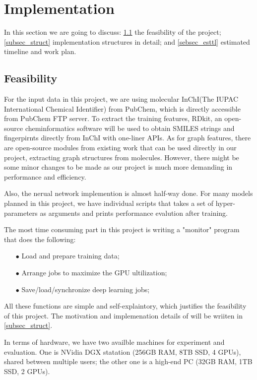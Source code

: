 \documentclass[conference]{IEEEtran}
\begin{document}
\section{Implementation} \label{sec_impl} 

In this section we are going to discuss: \ref{subsec_feas} the feasibility of the project; \ref{subsec_struct} implementation structures in detail; and \ref{sebsec_esttl} estimated timeline and work plan. 

\subsection{Feasibility} \label{subsec_feas} 

For the input data in this project, we are using molecular InChI(The IUPAC International Chemical Identifier) from PubChem, which is directly accessible from PubChem FTP server. 
To extract the training features, RDkit, an open-source cheminformatics software will be used to obtain SMILES strings and fingerpirnts directly from InChI with one-liner APIs. 
As for graph features, there are open-source modules from existing work \cite{gcn_fp} that can be used directly in our project, extracting graph structures from molecules. 
However, there might be some minor changes to be made as our project is much more demanding in performance and efficiency. 

Also, the nerual network implemention is almost half-way done. 
For many models planned in this project, we have individual scripts that takes a set of hyper-parameters as arguments and prints performance evalution after training. 

The most time consuming part in this project is writing a "monitor" program that does the following:
\begin{itemize}
	\item[$\bullet$]  Load and prepare training data;
	\item[$\bullet$]  Arrange jobs to maximize the GPU ultilization;
	\item[$\bullet$]  Save/load/synchronize deep learning jobs; 
\end{itemize}
All these functions are simple and self-explaintory, which justifies the feasibility of this project. 
The motivation and implemenation details of will be wriiten in \ref{subsec_struct}.

In terms of hardware, we have two availble machines for experiment and evaluation. 
One is NVidia DGX statation (256GB RAM, 8TB SSD, 4 GPUs), shared between multiple users; the other one is a high-end PC (32GB RAM, 1TB SSD, 2 GPUs). 
\end{document}
